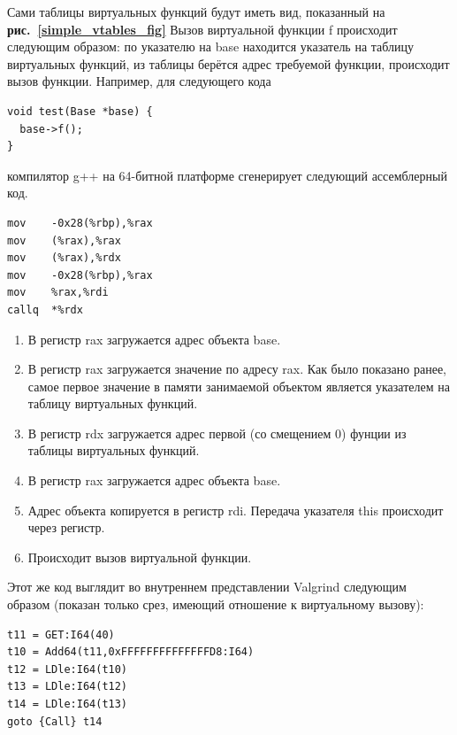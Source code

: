 \documentclass[a4paper,12pt,russian]{article}
\newcommand{\picref}[1]{\textbf{рис.~\ref{#1}}}
\newcommand{\code}[1]{\textsf{#1}}
\begin{document}
Сами таблицы виртуальных функций будут иметь вид, показанный на \picref{simple_vtables_fig}
Вызов виртуальной функции \code{f} происходит следующим образом: по указателю на \code{base} находится указатель на таблицу виртуальных функций, из таблицы берётся адрес требуемой функции, происходит вызов функции.
Например, для следующего кода
\begin{lstlisting}
void test(Base *base) {
  base->f();
}
\end{lstlisting}
компилятор g++ на 64-битной платформе сгенерирует следующий ассемблерный код.
\begin{minipage}[b]{\linewidth}
\vspace{0.5cm}
\begin{minipage}[t]{0.45\linewidth}
\begin{lstlisting}[language={[x86masm]Assembler}]
mov    -0x28(%rbp),%rax
mov    (%rax),%rax
mov    (%rax),%rdx
mov    -0x28(%rbp),%rax
mov    %rax,%rdi
callq  *%rdx
\end{lstlisting}
\end{minipage}
\vline
\begin{minipage}[t]{0.45\linewidth}
\begin{enumerate}
\item В регистр \code{rax} загружается адрес объекта \code{base}.
\item В регистр \code{rax} загружается значение по адресу \code{rax}. Как было показано ранее, самое первое значение в памяти занимаемой объектом является указателем на таблицу виртуальных функций.
\item В регистр \code{rdx} загружается адрес первой (со смещением $0$) фунции из таблицы виртуальных функций.
\item В регистр \code{rax} загружается адрес объекта \code{base}.
\item Адрес объекта копируется в регистр \code{rdi}. Передача указателя \code{this} происходит через регистр.
\item Происходит вызов виртуальной функции.
\end{enumerate}
\end{minipage}
\vspace{0.5cm}
\end{minipage}

Этот же код выглядит во внутреннем представлении \code{Valgrind} следующим образом (показан только срез, имеющий отношение к виртуальному вызову):
\label{vcall_valgrind_listing}
\begin{lstlisting}
t11 = GET:I64(40)
t10 = Add64(t11,0xFFFFFFFFFFFFFFD8:I64)
t12 = LDle:I64(t10)
t13 = LDle:I64(t12)
t14 = LDle:I64(t13)
goto {Call} t14
\end{lstlisting}
\end{document}
